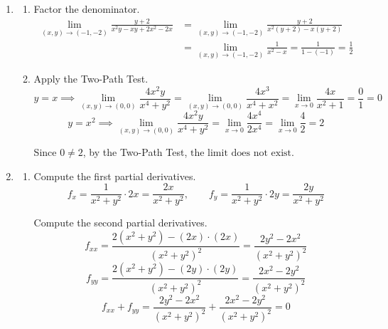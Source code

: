 \documentclass[a4paper, 12pt]{article}
\begin{document}
\begin{enumerate}[leftmargin=*,label=\textbf{\arabic*.}]
\begin{enumerate}[leftmargin=*,label=\textbf{\alph*.}]
The length of the curve is then
\begin{align*}L&=\int_0^1\left|\frac{d\mathbf r}{dt}\right|\,dt=\int_0^1\left|\left\langle e ^t\sin t+ e ^t\cdot\cos t,\: e ^t\cos t- e ^t\sin t,\: e ^t\right\rangle\right|\,dt\\[1em]&=\int_0^1\sqrt{\left( e ^t\sin t+ e ^t\cdot\cos t\right)^2+\left( e ^t\cos t- e ^t\sin t\right)^2+\left( e ^t\right)^2}\,dt\\[1em]&=\int_0^1\sqrt{\scriptstyle e ^{2t}\left(\sin^2t+2\sin t\cos t+\cos^2t\right)+ e ^t\left(\cos^2t-2\sin t\cos t+\sin^2t\right)+ e ^{2t}}\,dt\\[1em]&=\int_0^1\sqrt{3 e ^{2t}}\,dt=\int_0^1\sqrt3 e^t\,dt=\sqrt3 e ^t\bigg|_0^1=\boxed{\sqrt3( e-1)}\end{align*}

\end{enumerate}

\item \begin{enumerate}[leftmargin=*,label=\textbf{\alph*.}]

\item Factor the denominator.
\begin{align*}\lim_{(x,y)\to(-1,-2)}\frac{y+2}{x^2y-xy+2x^2-2x}&=\lim_{(x,y)\to(-1,-2)}\frac{y+2}{x^2(y+2)-x(y+2)}\\[1em]&=\lim_{(x,y)\to(-1,-2)}\frac1{x^2-x}=\frac1{1-(-1)}=\boxed{\frac12}\end{align*}

\item Apply the Two-Path Test.
\[y=x\implies\lim_{(x,y)\to(0,0)}\frac{4x^2y}{x^4+y^2}=\lim_{(x,y)\to(0,0)}\frac{4x^3}{x^4+x^2}=\lim_{x\to0}\frac{4x}{x^2+1}=\frac01=0\]
\[y=x^2\implies\lim_{(x,y)\to(0,0)}\frac{4x^2y}{x^4+y^2}=\lim_{x\to0}\frac{4x^4}{2x^4}=\lim_{x\to0}\frac42=2\]

Since $0\neq2$, by the Two-Path Test, $\boxed{\text{the limit does not exist}}$.

\end{enumerate}

\item \begin{enumerate}[leftmargin=*,label=\textbf{\alph*.}]

\item Compute the first partial derivatives.
\[f_x=\frac1{x^2+y^2}\cdot2x=\frac{2x}{x^2+y^2},\qquad f_y=\frac1{x^2+y^2}\cdot2y=\frac{2y}{x^2+y^2}\]

Compute the second partial derivatives.
\[f_{xx}=\frac{2\left(x^2+y^2\right)-(2x)\cdot(2x)}{\left(x^2+y^2\right)^2}=\frac{2y^2-2x^2}{\left(x^2+y^2\right)^2}\]\[f_{yy}=\frac{2\left(x^2+y^2\right)-(2y)\cdot(2y)}{\left(x^2+y^2\right)^2}=\frac{2x^2-2y^2}{\left(x^2+y^2\right)^2}\]
\[f_{xx}+f_{yy}=\frac{2y^2-2x^2}{\left(x^2+y^2\right)^2}+\frac{2x^2-2y^2}{\left(x^2+y^2\right)^2}=\boxed0\]


\end{enumerate}
\end{enumerate}
\end{document}
